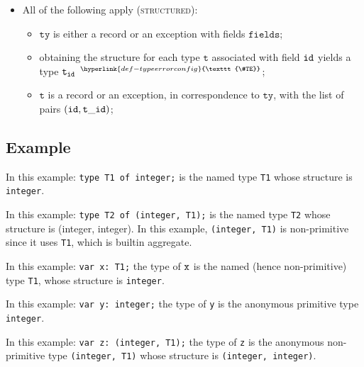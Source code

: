 \documentclass{book}
\newcommand\TypeErrorConfig[0]{\hyperlink{def-typeerrorconfig}{\texttt{\#TE}}}
\newcommand\ProseOrTypeError[0]{\hyperlink{def-proseortypeerror}{$^{\TypeErrorConfig}$}}
\newcommand\vt[0]{\texttt{t}}
\newcommand\tty[0]{\texttt{ty}}
\newcommand\fields[0]{\texttt{fields}}
\begin{document}
\begin{itemize}
\begin{itemize}
    \item $\vt$ is is an array type with of length $\ve$ with element type $\vtone$.
  \end{itemize}
\item All of the following apply (\textsc{structured}):
  \begin{itemize}
  \item $\tty$ is either a record or an exception with fields $\fields$;
  \item obtaining the structure for each type $\vt$ associated with field $\texttt{id}$ yields a type $\vt_\id$ \ProseOrTypeError;
  \item $\vt$ is a record or an exception, in correspondence to $\tty$, with the list of pairs $(\id, \vt\_\id)$;
  \end{itemize}
\end{itemize}

\subsection{Example}
In this example:
\texttt{type T1 of integer;} is the named type \texttt{T1}
whose structure is \texttt{integer}.

In this example:
\texttt{type T2 of (integer, T1);}
is the named type \texttt{T2} whose structure is (integer, integer). In this
example, \texttt{(integer, T1)} is non-primitive since it uses \texttt{T1}, which is builtin aggregate.

In this example:
\texttt{var x: T1;}
the type of $\texttt{x}$ is the named (hence non-primitive) type \texttt{T1}, whose structure
is \texttt{integer}.

In this example:
\texttt{var y: integer;}
the type of \texttt{y} is the anonymous primitive type \texttt{integer}.

In this example:
\texttt{var z: (integer, T1);}
the type of \texttt{z} is the anonymous non-primitive type
\texttt{(integer, T1)} whose structure is \texttt{(integer, integer)}.

\end{document}

